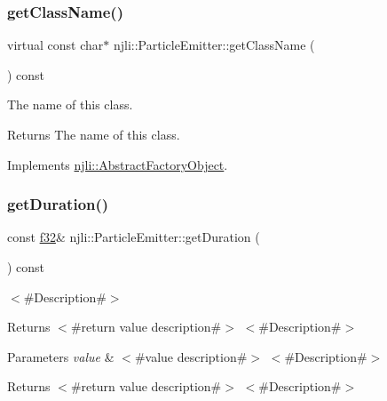 \subsubsection{\texorpdfstring{get\+Class\+Name()}{getClassName()}}
{\footnotesize\ttfamily virtual const char$\ast$ njli\+::\+Particle\+Emitter\+::get\+Class\+Name (\begin{DoxyParamCaption}{ }\end{DoxyParamCaption}) const\hspace{0.3cm}{\ttfamily [virtual]}}

The name of this class.

\begin{DoxyReturn}{Returns}
The name of this class. 
\end{DoxyReturn}


Implements \mbox{\hyperlink{classnjli_1_1_abstract_factory_object_af4151e41b80d5bc3fc42822c67fc2278}{njli\+::\+Abstract\+Factory\+Object}}.

\mbox{\label{classnjli_1_1_particle_emitter_af2fc6bc2e179185d7f481fd82646f746}} 
\subsubsection{\texorpdfstring{get\+Duration()}{getDuration()}}
{\footnotesize\ttfamily const \mbox{\hyperlink{_util_8h_a5f6906312a689f27d70e9d086649d3fd}{f32}}\& njli\+::\+Particle\+Emitter\+::get\+Duration (\begin{DoxyParamCaption}{ }\end{DoxyParamCaption}) const}

$<$\#\+Description\#$>$

\begin{DoxyReturn}{Returns}
$<$\#return value description\#$>$ $<$\#\+Description\#$>$
\end{DoxyReturn}

\begin{DoxyParams}{Parameters}
{\em value} & $<$\#value description\#$>$ $<$\#\+Description\#$>$\\
\hline
\end{DoxyParams}
\begin{DoxyReturn}{Returns}
$<$\#return value description\#$>$ $<$\#\+Description\#$>$
\end{DoxyReturn}

